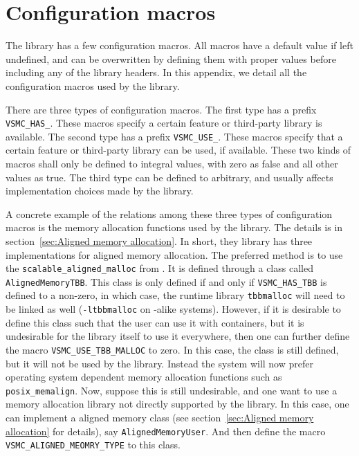 \chapter{Configuration macros}
\label{chap:Configuration macros}

The library has a few configuration macros. All macros have a default value if
left undefined, and can be overwritten by defining them with proper values
before including any of the library headers. In this appendix, we detail all
the configuration macros used by the library.

There are three types of configuration macros. The first type has a prefix
\verb|VSMC_HAS_|. These macros specify a certain feature or third-party library
is available. The second type has a prefix \verb|VSMC_USE_|. These macros
specify that a certain feature or third-party library can be used, if
available. These two kinds of macros shall only be defined to integral values,
with zero as false and all other values as true. The third type can be defined
to arbitrary, and usually affects implementation choices made by the library.

A concrete example of the relations among these three types of configuration
macros is the memory allocation functions used by the library. The details is
in section~\ref{sec:Aligned memory allocation}. In short, they library has
three implementations for aligned memory allocation. The preferred method is to
use the \verb|scalable_aligned_malloc| from \tbb. It is defined through a class
called \verb|AlignedMemoryTBB|. This class is only defined if and only if
\verb|VSMC_HAS_TBB| is defined to a non-zero, in which case, the runtime
library \verb|tbbmalloc| will need to be linked as well (\verb|-ltbbmalloc| on
\unix-alike systems). However, if it is desirable to define this class such
that the user can use it with \stl containers, but it is undesirable for the
library itself to use it everywhere, then one can further define the macro
\verb|VSMC_USE_TBB_MALLOC| to zero. In this case, the class is still defined,
but it will not be used by the library. Instead the system will now prefer
operating system dependent memory allocation functions such as
\verb|posix_memalign|. Now, suppose this is still undesirable, and one want to
use a memory allocation library not directly supported by the library. In this
case, one can implement a aligned memory class (see section~\ref{sec:Aligned
  memory allocation} for details), say \verb|AlignedMemoryUser|. And then define
the macro \verb|VSMC_ALIGNED_MEOMRY_TYPE| to this class.

